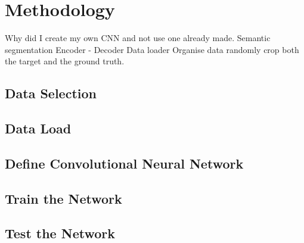 \chapter{Methodology}
Why did I create my own CNN and not use one already made.
Semantic segmentation
Encoder - Decoder
Data loader
Organise data
randomly crop both the target and the ground truth.

\section{Data Selection}

\section{Data Load}

\section{Define Convolutional Neural Network}

\section{Train the Network}

\section{Test the Network}